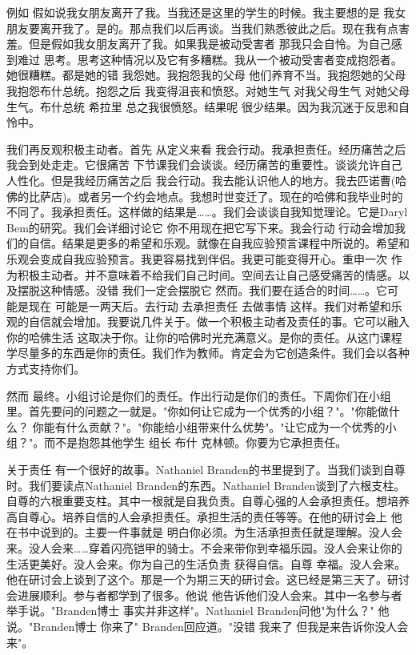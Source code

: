 例如 假如说我女朋友离开了我。当我还是这里的学生的时候。我主要想的是 我女朋友要离开我了。是的。那点我们以后再谈。当我们熟悉彼此之后。现在我有点害羞。但是假如我女朋友离开了我。如果我是被动受害者 那我只会自怜。为自己感到难过 思考。思考这种情况以及它有多糟糕。我从一个被动受害者变成抱怨者。她很糟糕。都是她的错 我怨她。我抱怨我的父母 他们养育不当。我抱怨她的父母 我抱怨布什总统。抱怨之后 我变得沮丧和愤怒。对她生气 对我父母生气 对她父母生气。布什总统 希拉里 总之我很愤怒。结果呢 很少结果。因为我沉迷于反思和自怜中。 

我们再反观积极主动者。首先 从定义来看 我会行动。我承担责任。经历痛苦之后我会到处走走。它很痛苦 下节课我们会谈谈。经历痛苦的重要性。谈谈允许自己人性化。但是我经历痛苦之后 我会行动。我去能认识他人的地方。我去匹诺曹(哈佛的比萨店)。或者另一个约会地点。我想时世变迁了。现在的哈佛和我毕业时的不同了。我承担责任。这样做的结果是……。我们会谈谈自我知觉理论。它是Daryl Bem的研究。我们会详细讨论它 你不用现在把它写下来。我会行动 行动会增加我们的自信。结果是更多的希望和乐观。就像在自我应验预言课程中所说的。希望和乐观会变成自我应验预言。我更容易找到伴侣。我更可能变得开心。重申一次 作为积极主动者。并不意味着不给我们自己时间。空间去让自己感受痛苦的情感。以及摆脱这种情感。没错 我们一定会摆脱它 然而。我们要在适合的时间……。它可能是现在 可能是一两天后。去行动 去承担责任 去做事情 这样。我们对希望和乐观的自信就会增加。我要说几件关于。做一个积极主动者及责任的事。它可以融入你的哈佛生活 这取决于你。让你的哈佛时光充满意义。是你的责任。从这门课程学尽量多的东西是你的责任。我们作为教师。肯定会为它创造条件。我们会以各种方式支持你们。 

然而 最终。小组讨论是你们的责任。作出行动是你们的责任。下周你们在小组里。首先要问的问题之一就是。"你如何让它成为一个优秀的小组？"。"你能做什么？ 你能有什么贡献？"。"你能给小组带来什么优势"。"让它成为一个优秀的小组？"。而不是抱怨其他学生 组长 布什 克林顿。你要为它承担责任。 

关于责任 有一个很好的故事。Nathaniel Branden的书里提到了。当我们谈到自尊时。我们要读点Nathaniel Branden的东西。Nathaniel Branden谈到了六根支柱。自尊的六根重要支柱。其中一根就是自我负责。自尊心强的人会承担责任。想培养高自尊心。培养自信的人会承担责任。承担生活的责任等等。在他的研讨会上 他在书中说到的。主要一件事就是 明白你必须。为生活承担责任就是理解。没人会来。没人会来……穿着闪亮铠甲的骑士。不会来带你到幸福乐园。没人会来让你的生活更美好。没人会来。你为自己的生活负责 获得自信。自尊 幸福。没人会来。他在研讨会上谈到了这个。那是一个为期三天的研讨会。这已经是第三天了。研讨会进展顺利。参与者都学到了很多。他说 他告诉他们没人会来。其中一名参与者举手说。"Branden博士 事实并非这样"。Nathaniel Branden问他"为什么？" 他说。"Branden博士 你来了" Branden回应道。"没错 我来了 但我是来告诉你没人会来"。 

